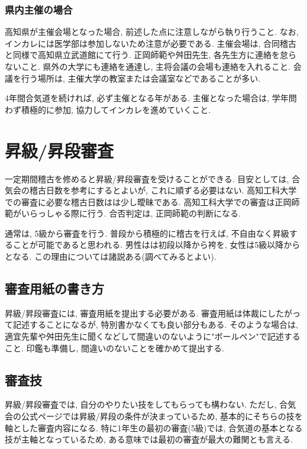 \documentclass[a4j,titlepage]{jarticle}
\begin{document}
\subsubsection{県内主催の場合}
高知県が主催会場となった場合, 前述した点に注意しながら執り行うこと. なお, インカレには医学部は参加しないため注意が必要である. 主催会場は, 合同稽古と同様で高知県立武道館にて行う. 正岡師範や舛田先生, 各先生方に連絡を怠らないこと. 県外の大学にも連絡を通達し, 主将会議の会場も連絡を入れること. 会議を行う場所は, 主催大学の教室または会議室などであることが多い. \par
4年間合気道を続ければ, 必ず主催となる年がある. 主催となった場合は, 学年問わず積極的に参加, 協力してインカレを進めていくこと.

\section{昇級/昇段審査}
一定期間稽古を修めると昇級/昇段審査を受けることができる. 目安としては, 合気会の稽古日数を参考にするとよいが, これに順ずる必要はない. 高知工科大学での審査に必要な稽古日数はは少し曖昧である. 高知工科大学での審査は正岡師範がいらっしゃる際に行う. 合否判定は, 正岡師範の判断になる. \par
通常は, 5級から審査を行う. 普段から積極的に稽古を行えば, 不自由なく昇級することが可能であると思われる. 男性はは初段以降から袴を, 女性は5級以降からとなる. この理由については諸説ある(調べてみるとよい).

\subsection{審査用紙の書き方}
昇級/昇段審査には, 審査用紙を提出する必要がある. 審査用紙は体裁にしたがって記述することになるが, 特別書かなくても良い部分もある. そのような場合は, 適宜先輩や舛田先生に聞くなどして間違いのないように"ボールペン"で記述すること. 印鑑も準備し, 間違いのないことを確かめて提出する. 


\subsection{審査技}
昇級/昇段審査では, 自分のやりたい技をしてもらっても構わない. ただし, 合気会の公式ページでは昇級/昇段の条件が決まっているため, 基本的にそちらの技を軸とした審査内容になる. 特に1年生の最初の審査(5級)では, 合気道の基本となる技が主軸となっているため, ある意味では最初の審査が最大の難関とも言える. 
\end{document}
